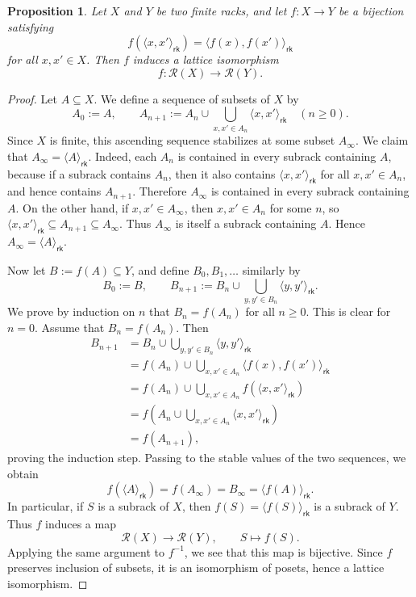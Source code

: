 \documentclass[a4paper,12pt]{article}
\newtheorem{prop}[thm]{Proposition}
\theoremstyle{definition}
\theoremstyle{remark}
\begin{document}
\begin{prop}\label{prop:pairs}
  Let $X$ and $Y$ be two finite racks, and let $f\colon X\to Y$ be a bijection satisfying
  $$ f(\langle x,x'\rangle_{\mathsf{rk}}) = \langle f(x),f(x')\rangle_{\mathsf{rk}} $$
  for all $x,x'\in X$. Then $f$ induces a lattice isomorphism
  $$ f\colon\mathcal{R}(X)\to \mathcal{R}(Y). $$
\end{prop}

\begin{proof}
  Let $A\subseteq X$. We define a sequence of subsets of $X$ by
  $$ A_0:=A,\qquad A_{n+1}:=A_n\cup\bigcup_{x,x'\in A_n}\langle x,x'\rangle_{\mathsf{rk}} \quad (n\geq 0). $$
  Since $X$ is finite, this ascending sequence stabilizes at some subset $A_\infty$. We claim that $A_\infty=\langle A\rangle_{\mathsf{rk}}$. Indeed, each $A_n$ is contained in every subrack containing $A$, because if a subrack contains $A_n$, then it also contains $\langle x,x'\rangle_{\mathsf{rk}}$ for all $x,x'\in A_n$, and hence contains $A_{n+1}$. Therefore $A_\infty$ is contained in every subrack containing $A$. On the other hand, if $x,x'\in A_\infty$, then $x,x'\in A_n$ for some $n$, so $\langle x,x'\rangle_{\mathsf{rk}}\subseteq A_{n+1}\subseteq A_\infty$. Thus $A_\infty$ is itself a subrack containing $A$. Hence $A_\infty=\langle A\rangle_{\mathsf{rk}}$.

  Now let $B:=f(A)\subseteq Y$, and define $B_0,B_1,\dots$ similarly by
  $$ B_0:=B,\qquad B_{n+1}:=B_n\cup\bigcup_{y,y'\in B_n}\langle y,y'\rangle_{\mathsf{rk}}. $$
  We prove by induction on $n$ that $B_n=f(A_n)$ for all $n\geq 0$. This is clear for $n=0$. Assume that $B_n=f(A_n)$. Then
  \begin{align*}
    B_{n+1}
      &= B_n\cup\bigcup_{y,y'\in B_n}\langle y,y'\rangle_{\mathsf{rk}} \\
      &= f(A_n)\cup\bigcup_{x,x'\in A_n}\langle f(x),f(x')\rangle_{\mathsf{rk}} \\
      &= f(A_n)\cup\bigcup_{x,x'\in A_n} f(\langle x,x'\rangle_{\mathsf{rk}}) \\
      &= f\!\left(A_n\cup\bigcup_{x,x'\in A_n}\langle x,x'\rangle_{\mathsf{rk}}\right) \\
      &= f(A_{n+1}),
  \end{align*}
  proving the induction step. Passing to the stable values of the two sequences, we obtain
  $$ f(\langle A\rangle_{\mathsf{rk}})=f(A_\infty)=B_\infty=\langle f(A)\rangle_{\mathsf{rk}}. $$
  In particular, if $S$ is a subrack of $X$, then $f(S)=\langle f(S)\rangle_{\mathsf{rk}}$ is a subrack of $Y$. Thus $f$ induces a map
  $$ \mathcal{R}(X)\to\mathcal{R}(Y),\qquad S\mapsto f(S). $$
  Applying the same argument to $f^{-1}$, we see that this map is bijective. Since $f$ preserves inclusion of subsets, it is an isomorphism of posets, hence a lattice isomorphism.
\end{proof}
\end{document}
